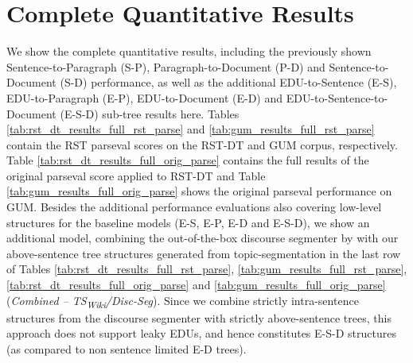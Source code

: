 \documentclass[letterpaper]{article} %
\begin{document}
\section{Complete Quantitative Results}
\label{app:results_parse}
We show the complete quantitative results, including the previously shown Sentence-to-Paragraph (S-P), Paragraph-to-Document (P-D) and Sentence-to-Document (S-D) performance, as well as the additional EDU-to-Sentence (E-S), EDU-to-Paragraph (E-P), EDU-to-Document (E-D) and EDU-to-Sentence-to-Document (E-S-D) sub-tree results here. Tables \ref{tab:rst_dt_results_full_rst_parse} and \ref{tab:gum_results_full_rst_parse} contain the RST parseval scores on the RST-DT and GUM corpus, respectively. Table \ref{tab:rst_dt_results_full_orig_parse} contains the full results of the original parseval score applied to RST-DT and Table \ref{tab:gum_results_full_orig_parse} shows the original parseval performance on GUM. Besides the additional performance evaluations also covering low-level structures for the baseline models (E-S, E-P, E-D and E-S-D), we show an additional model, combining the out-of-the-box discourse segmenter by \citet{wang-etal-2018-toward} with our above-sentence tree structures generated from topic-segmentation in the last row of Tables \ref{tab:rst_dt_results_full_rst_parse}, \ref{tab:gum_results_full_rst_parse}, \ref{tab:rst_dt_results_full_orig_parse} and \ref{tab:gum_results_full_orig_parse} (\textit{Combined -- TS\textsubscript{Wiki}/Disc-Seg}). Since we combine strictly intra-sentence structures from the discourse segmenter with strictly above-sentence trees, this approach does not support leaky EDUs, and hence constitutes E-S-D structures (as compared to non sentence limited E-D trees).
\end{document}
